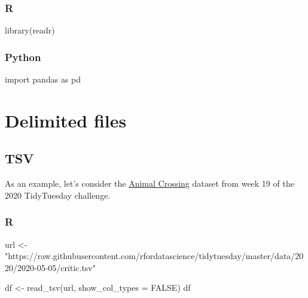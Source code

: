 \documentclass[
  letterpaper,
  DIV=11,
  numbers=noendperiod]{scrreprt}
\newenvironment{Shaded}{\begin{snugshade}}{\end{snugshade}}
\newcommand{\AttributeTok}[1]{\textcolor[rgb]{0.40,0.46,0.14}{#1}}
\newcommand{\ConstantTok}[1]{\textcolor[rgb]{0.56,0.35,0.01}{#1}}
\newcommand{\FunctionTok}[1]{\textcolor[rgb]{0.28,0.35,0.67}{#1}}
\newcommand{\ImportTok}[1]{\textcolor[rgb]{0.00,0.46,0.62}{#1}}
\newcommand{\NormalTok}[1]{\textcolor[rgb]{0.00,0.46,0.62}{#1}}
\newcommand{\OtherTok}[1]{\textcolor[rgb]{0.00,0.46,0.62}{#1}}
\newcommand{\StringTok}[1]{\textcolor[rgb]{0.13,0.47,0.30}{#1}}
\begin{document}
\hypertarget{r}{%
\subsubsection{R}\label{r}}

\begin{Shaded}
\begin{Highlighting}[]
\FunctionTok{library}\NormalTok{(readr)}
\end{Highlighting}
\end{Shaded}

\hypertarget{python}{%
\subsubsection{Python}\label{python}}

\begin{Shaded}
\begin{Highlighting}[]
\ImportTok{import}\NormalTok{ pandas }\ImportTok{as}\NormalTok{ pd}
\end{Highlighting}
\end{Shaded}

\hypertarget{delimited-files}{%
\section{Delimited files}\label{delimited-files}}

\hypertarget{tsv}{%
\subsection{TSV}\label{tsv}}

As an example, let's consider the
\href{https://github.com/rfordatascience/tidytuesday/blob/master/data/2020/2020-05-05}{Animal
Crossing} dataset from week 19 of the 2020 TidyTuesday challenge.

\hypertarget{r-1}{%
\subsubsection{R}\label{r-1}}

\begin{Shaded}
\begin{Highlighting}[]
\NormalTok{url }\OtherTok{\textless{}{-}} \StringTok{"https://raw.githubusercontent.com/rfordatascience/tidytuesday/master/data/2020/2020{-}05{-}05/critic.tsv"}

\NormalTok{df }\OtherTok{\textless{}{-}} \FunctionTok{read\_tsv}\NormalTok{(url, }\AttributeTok{show\_col\_types =} \ConstantTok{FALSE}\NormalTok{)}
\NormalTok{df}
\end{Highlighting}
\end{Shaded}
\end{document}

